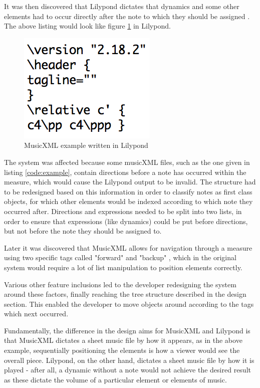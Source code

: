 It was then discovered that Lilypond dictates that dynamics and some other elements had to occur directly after the note to which they should be assigned \parencite{ExpressionLilypond}.  The above listing would look like figure \ref{code:lily} in Lilypond.

\begin{figure}[H]
\centering
\includegraphics{lilyexample-code}
\caption{MusicXML example written in Lilypond}
\label{code:lily}	
\end{figure}


 The system was affected because some musicXML files, such as the one given in listing \ref{code:example}, contain directions before a note has occurred within the measure, which would cause the Lilypond output to be invalid. 
 The structure had to be redesigned based on this information in order to classify notes as first class objects, for which other elements would be indexed according to which note they occurred after. Directions and expressions needed to be split into two lists, in order to ensure that expressions (like dynamics) could be put before directions, but not before the note they should be assigned to.

Later it was discovered that MusicXML allows for navigation through a measure using two specific tags called "forward" and "backup" \parencite{forward}, which in the original system would require a lot of list manipulation to position elements correctly. 

Various other feature inclusions led to the developer redesigning the system around these factors, finally reaching the tree structure described in the design section. This enabled the developer to move objects around according to the tags which next occurred.

Fundamentally, the difference in the design aims for MusicXML and Lilypond is that MusicXML dictates a sheet music file by how it appears, as in the above example, sequentially positioning the elements is how a viewer would see the overall piece. Lilypond, on the other hand, dictates a sheet music file by how it is played - after all, a dynamic without a note would not achieve the desired result as these dictate the volume of a particular element or elements of music. 

